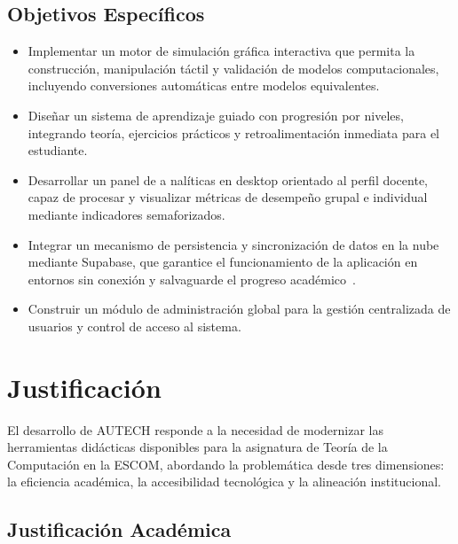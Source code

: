 \subsection{Objetivos Específicos}
\label{ssec:obj_especificos}

\begin{itemize}
    \item Implementar un motor de simulación gráfica interactiva que permita la construcción,
        manipulación táctil y validación de modelos computacionales, incluyendo conversiones
        automáticas entre modelos equivalentes.

    \item Diseñar un sistema de aprendizaje guiado con progresión por niveles, integrando
        teoría, ejercicios prácticos y retroalimentación inmediata para el estudiante.

    \item Desarrollar un panel de a nalíticas en desktop orientado al perfil docente, capaz de
        procesar y visualizar métricas de desempeño grupal e individual mediante indicadores
        semaforizados.

    \item Integrar un mecanismo de persistencia y sincronización de datos en la nube mediante
        Supabase, que garantice el funcionamiento de la aplicación en entornos sin conexión y
        salvaguarde el progreso académico~\cite{supabase2024}.

    \item Construir un módulo de administración global para la gestión centralizada de usuarios
        y control de acceso al sistema.
\end{itemize}

\section{Justificación}
\label{sec:justificacion}

El desarrollo de AUTECH responde a la necesidad de modernizar las herramientas didácticas
disponibles para la asignatura de Teoría de la Computación en la ESCOM, abordando la
problemática desde tres dimensiones: la eficiencia académica, la accesibilidad tecnológica y
la alineación institucional.

\subsection{Justificación Académica}
\label{ssec:just_academica}

